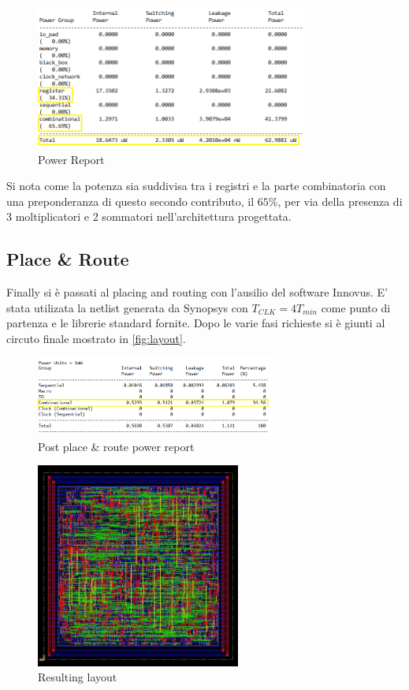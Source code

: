 \begin{figure}[htb]
	\center
	\includegraphics[width=0.8\textwidth]{images/rep_power_x4_mod.png}
	\caption{Power Report}
	\label{fig:pow_rep_x4}
\end{figure}

Si nota come la potenza sia suddivisa tra i registri e la parte combinatoria con una preponderanza di questo secondo contributo, il $65\%$, per via della presenza di 3 moltiplicatori e 2 sommatori nell'architettura progettata.

\subsection{Place \& Route}
Finally si è passati al placing and routing con l'ausilio del software Innovus. E' stata utilizata la netlist generata da Synopsys con $T_{CLK} = 4 T_{min}$ come punto di partenza e le librerie standard fornite. Dopo le varie fasi richieste si è giunti al circuto finale mostrato in \autoref{fig:layout}.

\begin{figure}[htb]
	\center
	\includegraphics[width=0.7\textwidth]{images/rep_power_x4_cadence_mod.png}
	\caption{Post place \& route power report}
	\label{fig:cadence_pow_rep_x4}
\end{figure}

\begin{figure}[htb]
	\center
	\includegraphics[width=0.6\textwidth]{images/IIR_filter_period_min_x4_place.jpg}
	\caption{Resulting layout}
	\label{fig:layout}
\end{figure}

